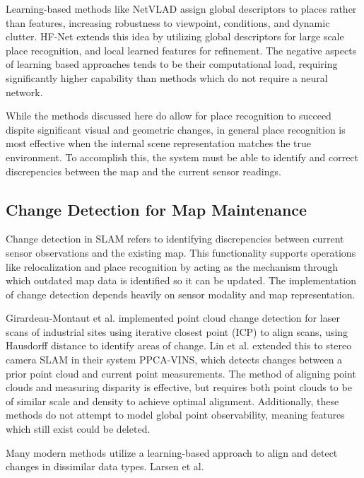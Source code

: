 Learning-based methods like NetVLAD \cite{arandjelovicNetVLADCNNArchitecture2016} assign global descriptors to places rather than features, increasing robustness to viewpoint, conditions, and dynamic clutter. HF-Net \cite{sarlinCoarseFineRobust2019} extends this idea by utilizing global descriptors for large scale place recognition, and local learned features for refinement. The negative aspects of learning based approaches tends to be their computational load, requiring significantly higher capability than methods which do not require a neural network.

While the methods discussed here do allow for place recognition to succeed dispite significant visual and geometric changes, in general place recognition is most effective when the internal scene representation matches the true environment. To accomplish this, the system must be able to identify and correct discrepencies between the map and the current sensor readings.

\subsection{Change Detection for Map Maintenance}

Change detection in SLAM refers to identifying discrepencies between current sensor observations and the existing map. This functionality supports operations like relocalization and place recognition by acting as the mechanism through which outdated map data is identified so it can be updated. The implementation of change detection depends heavily on sensor modality and map representation.

Girardeau-Montaut et al. \cite{girardeau-montautCHANGEDETECTIONPOINTS2005} implemented point cloud change detection for laser scans of industrial sites using iterative closest point (ICP) \cite{arunLeastSquaresFittingTwo1987}
\cite{beslMethodRegistration3D1992} to align scans, using Hausdorff distance \cite{aspertMESHMeasuringErrors2002} to identify areas of change. Lin et al. \cite{linPointCloudChange2022} extended this to stereo camera SLAM in their system PPCA-VINS, which detects changes between a prior point cloud and current point measurements. The method of aligning point clouds and measuring disparity is effective, but requires both point clouds to be of similar scale and density to achieve optimal alignment. Additionally, these methods do not attempt to model global point observability, meaning features which still exist could be deleted.

Many modern methods utilize a learning-based approach to align and detect changes in dissimilar data types. Larsen et al. \cite{larsenChangeDetectionModel}

